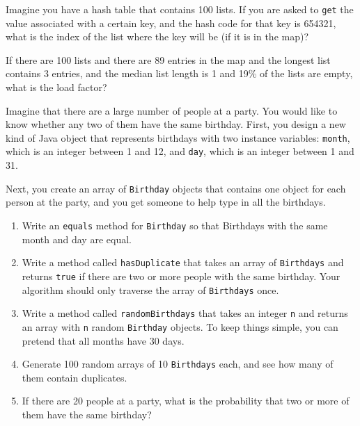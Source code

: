 \begin{exercise}
Imagine you have a hash table that
contains 100 lists.  If you are asked to {\tt get} the value associated
with a certain key, and the hash code for that key is 654321, what is
the index of the list where the key will be (if it is in the map)?
\end{exercise}


\begin{exercise}
If there are 100 lists and there are 89 entries in the
map and the longest list contains 3 entries, and the median
list length is 1 and 19\% of the lists are empty, what is the load
factor?
\end{exercise}


\begin{exercise}
Imagine that there are a large number of people at a party.
You would like to know whether any two of them have the same
birthday.  First, you design a new kind of Java object that
represents birthdays with two instance variables:
{\tt month}, which is an integer between 1 and 12, and
{\tt day}, which is an integer between 1 and 31.

Next, you create an array of {\tt Birthday} objects that
contains one object for each person at the party, and you
get someone to help type in all the birthdays.

\begin{enumerate}

\item Write an {\tt equals} method for {\tt Birthday} so that
Birthdays with the same month and day are equal.

\item Write a method called {\tt hasDuplicate} that takes
an array of {\tt Birthdays} and returns {\tt true} if there
are two or more people with the same birthday.
Your algorithm should only traverse the array of
{\tt Birthdays} once.

\item Write a method called {\tt randomBirthdays} that takes
an integer {\tt n} and returns an array with {\tt n} random
{\tt Birthday} objects.  To keep things simple, you can pretend
that all months have 30 days.

\item Generate 100 random arrays of 10 {\tt Birthdays} each, and
see how many of them contain duplicates.

\item If there are 20 people at a party, what is the probability
that two or more of them have the same birthday?

\end{enumerate}
\end{exercise}


